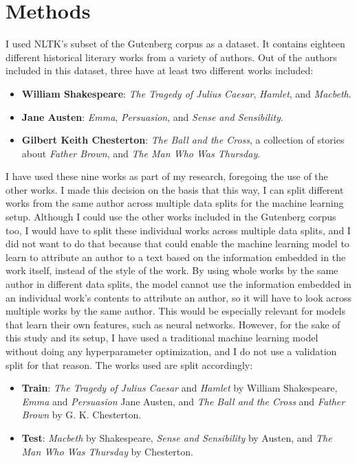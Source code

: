 \documentclass{article}
\begin{document}
\section{Methods}
I used NLTK's subset of the Gutenberg corpus as a dataset.
It contains eighteen different historical literary works from a variety of authors.
Out of the authors included in this dataset, three have at least two different works included:
\begin{itemize}
  \item \textbf{William Shakespeare}: \textit{The Tragedy of Julius Caesar}, \textit{Hamlet}, and \textit{Macbeth}.
  \item \textbf{Jane Austen}: \textit{Emma}, \textit{Persuasion}, and \textit{Sense and Sensibility}.
  \item \textbf{Gilbert Keith Chesterton}: \textit{The Ball and the Cross}, a collection of stories about \textit{Father Brown}, and \textit{The Man Who Was Thursday}.
\end{itemize}
I have used these nine works as part of my research, foregoing the use of the other works.
I made this decision on the basis that this way, I can split different works from the same author across multiple data splits for the machine learning setup.
Although I could use the other works included in the Gutenberg corpus too, I would have to split these individual works across multiple data splits, and I did not want to do that because that could enable the machine learning model to learn to attribute an author to a text based on the information embedded in the work itself, instead of the style of the work.
By using whole works by the same author in different data splits, the model cannot use the information embedded in an individual work's contents to attribute an author, so it will have to look across multiple works by the same author.
This would be especially relevant for models that learn their own features, such as neural networks.
However, for the sake of this study and its setup, I have used a traditional machine learning model without doing any hyperparameter optimization, and I do not use a validation split for that reason.
The works used are split accordingly:
\begin{itemize}
  \item \textbf{Train}: \textit{The Tragedy of Julius Caesar} and \textit{Hamlet} by William Shakespeare, \textit{Emma} and \textit{Persuasion} Jane Austen, and \textit{The Ball and the Cross} and \textit{Father Brown} by G. K. Chesterton.
  \item \textbf{Test}: \textit{Macbeth} by Shakespeare, \textit{Sense and Sensibility} by Austen, and \textit{The Man Who Was Thursday} by Chesterton.
\end{itemize}
\end{document}
